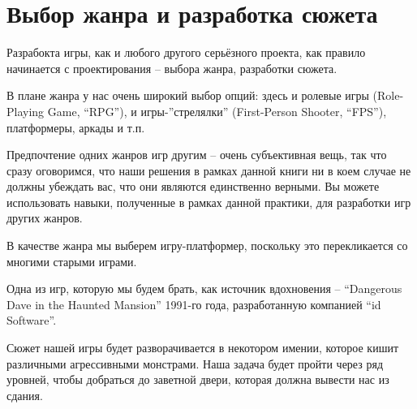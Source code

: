 \documentclass[../sparc.tex]{subfiles}
\begin{document}
\section{Выбор жанра и разработка сюжета}

Разрабокта игры, как и любого другого серьёзного проекта, как правило начинается
с проектирования -- выбора жанра, разработки сюжета.

В плане жанра у нас очень широкий выбор опций: здесь и ролевые игры
(Role-Playing Game, ``RPG''), и игры-''стрелялки'' (First-Person Shooter,
``FPS''), платформеры, аркады и т.п.

Предпочтение одних жанров игр другим -- очень субъективная вещь, так что сразу
оговоримся, что наши решения в рамках данной книги ни в коем случае не должны
убеждать вас, что они являются единственно верными.  Вы можете использовать
навыки, полученные в рамках данной практики, для разработки игр других жанров.

В качестве жанра мы выберем игру-платформер, поскольку это перекликается со
многими старыми играми.

Одна из игр, которую мы будем брать, как источник вдохновения -- ``Dangerous
Dave in the Haunted Mansion'' 1991-го года, разработанную компанией ``id
Software''.

Сюжет нашей игры будет разворачивается в некотором имении, которое кишит
различными агрессивными монстрами.  Наша задача будет пройти через ряд уровней,
чтобы добраться до заветной двери, которая должна вывести нас из сдания.
\end{document}
